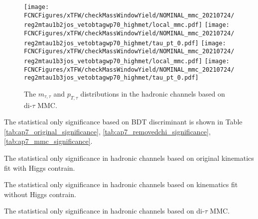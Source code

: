 \begin{figure}[H]
\centering
\texttt{[image: \\FCNCFigures/xTFW/checkMassWindowYield/NOMINAL\_mmc\_20210724/reg2mtau1b2jos\_vetobtagwp70\_highmet/local\_mmc.pdf]}
\texttt{[image: \\FCNCFigures/xTFW/checkMassWindowYield/NOMINAL\_mmc\_20210724/reg2mtau1b2jos\_vetobtagwp70\_highmet/tau\_pt\_0.pdf]}
\texttt{[image: \\FCNCFigures/xTFW/checkMassWindowYield/NOMINAL\_mmc\_20210724/reg2mtau1b3jos\_vetobtagwp70\_highmet/local\_mmc.pdf]}
\texttt{[image: \\FCNCFigures/xTFW/checkMassWindowYield/NOMINAL\_mmc\_20210724/reg2mtau1b3jos\_vetobtagwp70\_highmet/tau\_pt\_0.pdf]}
\caption{The $m_{\tau,\tau}$ and $p_{T,\tau}$ distributions in the hadronic channels based on di-$\tau$ MMC.}
\label{fig:ap7_ttmass_mmc}
\end{figure}


The statistical only significance based on BDT discriminant is shown in Table \ref{tab:ap7_original_significance}, \ref{tab:ap7_removedchi_significance},\ref{tab:ap7_mmc_significance}.

\begin{table}
\caption{The statistical only significance in hadronic channels based on original kinematics fit with Higgs contrain.}
\label{tab:ap7_original_significance}

\end{table}

\begin{table}
\caption{The statistical only significance in hadronic channels based on kinematics fit without Higgs contrain.}
\label{tab:ap7_removedchi_significance}

\end{table}

\begin{table}
\caption{The statistical only significance in hadronic channels based on di-$\tau$ MMC.}
\label{tab:ap7_mmc_significance}

\end{table}

